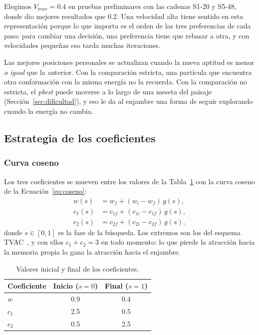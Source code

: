 Elegimos $V_{max} = 0.4$ en pruebas preliminares con las cadenas S1-20 y S5-48, donde dio mejores resultados que 0.2. Una velocidad alta tiene sentido en esta representación porque lo que importa es el orden de las tres preferencias de cada paso: para cambiar una decisión, una preferencia tiene que rebasar a otra, y con velocidades pequeñas eso tarda muchas iteraciones.

Las mejores posiciones personales se actualizan cuando la nueva aptitud es menor \textit{o igual} que la anterior. Con la comparación estricta, una partícula que encuentra otra conformación con la misma energía no la recuerda. Con la comparación no estricta, el \textit{pbest} puede moverse a lo largo de una meseta del paisaje (Sección~\ref{sec:dificultad}), y eso le da al enjambre una forma de seguir explorando cuando la energía no cambia.

\subsection{Estrategia de los coeficientes}
\label{sec:estrategia}

\subsubsection{Curva coseno}

Los tres coeficientes se mueven entre los valores de la Tabla~\ref{tab:coeficientes} con la curva coseno de la Ecuación~\eqref{eq:coseno}:
\begin{align}
w(s)   &= w_f + (w_i - w_f)\, g(s), \label{eq:w_cos}\\
c_1(s) &= c_{1f} + (c_{1i} - c_{1f})\, g(s), \label{eq:c1_cos}\\
c_2(s) &= c_{2f} + (c_{2i} - c_{2f})\, g(s), \label{eq:c2_cos}
\end{align}
donde $s \in [0,1]$ es la fase de la búsqueda. Los extremos son los del esquema TVAC~\cite{shi1999empirical, ratnaweera2004self}, y con ellos $c_1 + c_2 = 3$ en todo momento: lo que pierde la atracción hacia la memoria propia lo gana la atracción hacia el enjambre.

\begin{table}[H]
\centering
\caption{Valores inicial y final de los coeficientes.}
\label{tab:coeficientes}
\begin{tabular}{lcc}
\toprule
Coeficiente & Inicio ($s = 0$) & Final ($s = 1$) \\
\midrule
$w$   & 0.9 & 0.4 \\
$c_1$ & 2.5 & 0.5 \\
$c_2$ & 0.5 & 2.5 \\
\bottomrule
\end{tabular}
\end{table}

